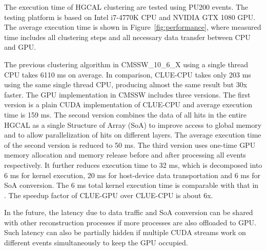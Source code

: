 The execution time of HGCAL clustering are tested using PU200 events. The testing platform is based on Intel i7-4770K CPU and NVIDIA GTX 1080 GPU. The average execution time is shown in Figure~\ref{fig:performance}, where measured time includes all clustering steps and all necessary data transfer between CPU and GPU. 

The previous clustering algorithm in CMSSW\_10\_6\_X using a single thread CPU takes 6110 ms on average. In comparison, CLUE-CPU takes only 203 ms using the same single thread CPU, producing almost the same result but 30x faster. The GPU implementation in CMSSW includes three versions. The first version is a plain CUDA implementation of CLUE-CPU and average execution time is 159 ms. The second version combines the data of all hits in the entire HGCAL as a single Structure of Array (SoA) to improve access to global memory and to allow parallelization of hits on different layers. The average execution time of the second version is reduced to 50 ms. The third version uses one-time GPU memory allocation and memory release before and after processing all events respectively. It further reduces execution time to 32 ms, which is decomposed into 6 ms for kernel execution, 20 ms for host-device data transportation and 6 ms for SoA conversion. The 6 ms total kernel execution time is comparable with that in \cite{cluepaper}. The speedup factor of CLUE-GPU over CLUE-CPU is about 6x. 

In the future, the latency due to data traffic and SoA conversion can be shared with other reconstruction processes if more processes are also offloaded to GPU. Such latency can also be partially hidden if multiple CUDA streams work on different events simultaneously to keep the GPU occupied.
